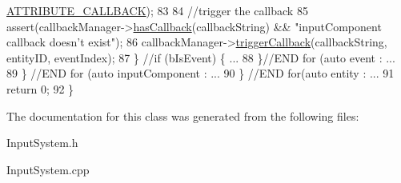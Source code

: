 \begin{DoxyCode}
      \hyperlink{_a_e___attributes_8h_a8602d00b356bb7e6ba95069a94fd5555}{ATTRIBUTE\_CALLBACK});
83                     
84                     \textcolor{comment}{//trigger the callback}
85                     assert(callbackManager->\hyperlink{class_callback_manager_a60aeb116e1cb38de4091e978d9aa8197}{hasCallback}(callbackString) && \textcolor{stringliteral}{"inputComponent
       callback doesn't exist"});
86                     callbackManager->\hyperlink{class_callback_manager_a4c5dc4430f0fb5cebe240be020a8fbe9}{triggerCallback}(callbackString, entityID, eventIndex);
87                 \} \textcolor{comment}{//if (bIsEvent) \{ ...}
88             \}\textcolor{comment}{//END for (auto event : ...}
89         \} \textcolor{comment}{//END for (auto inputComponent : ...}
90     \} \textcolor{comment}{//END for(auto entity : ...}
91     \textcolor{keywordflow}{return} 0;
92 \}
\end{DoxyCode}


The documentation for this class was generated from the following files\-:\begin{DoxyCompactItemize}
\item 
Input\-System.\-h\item 
Input\-System.\-cpp\end{DoxyCompactItemize}
